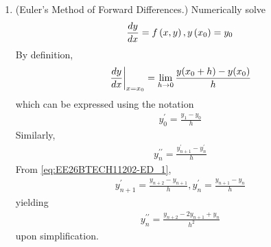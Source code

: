 \begin{enumerate}[label=\thesubsection.\arabic*, ref=\thesubsection.\theenumi]
\begin{align}
\end{align}
in \eqref{eq:EE26BTECH11202-Laplace_5-diff-1},
\begin{align}
	Y(s)&=\frac{s\beta + \gamma}{s^2 + \alpha^2}
\\
	    &=\frac{s\beta}{s^2 + \alpha^2}+\frac{\gamma}{s^2 + \alpha^2}
\end{align}
yielding
\begin{align}
	y(t)=\beta \cos(\alpha t) + \frac{\gamma}{\alpha}\sin(\alpha t) \label{eq:EE26BTECH11202-Laplace_7}
\end{align}
from \eqref{eq:EE26BTECH11202-Laplace_5}.
\item (Euler's Method of Forward Differences.)  Numerically solve 
\begin{align}
	\frac{dy}{dx}=f\left(x,y\right), y\left(x_0\right)=y_0
\end{align}
\solution By definition,
\begin{align}
	\left.\frac{dy}{dx}\right\vert_{x = x_0}= \lim_{h \to 0}\frac{y(x_0+h)-y(x_0)}{h}
\label{eq:derivative}
\end{align}
which can be expressed using the notation
\begin{align}
	y^{\prime}_0=\frac{y_{1}-y_0}{h} 
	\label{eq:EE26BTECH11202-ED_1}
\end{align}
Similarly,
\begin{align}
	y_n^{\prime \prime}=\frac{y_{n+1}^{\prime}-y_n^{\prime}}{h}
\end{align}
		From \eqref{eq:EE26BTECH11202-ED_1}, 
		\begin{align}
			y_{n+1}^{\prime}=\frac{y_{n+2}-y_{n+1}}{h}, y_n^{\prime}=\frac{y_{n+1}-y_n}{h}
		\end{align}
		yielding
\begin{align}
	y_n^{\prime \prime}=\frac{y_{n+2}-2y_{n+1}+y_n}{h^2} \label{eq:EE26BTECH11202-ED_2}
\end{align}
upon simplification.


\end{enumerate}
